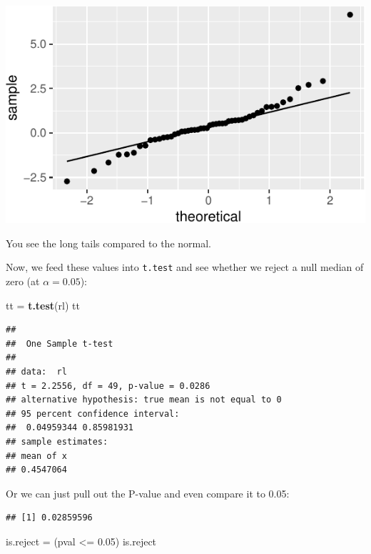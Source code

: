 \documentclass[]{tufte-book}
\newenvironment{Shaded}{}{}
\newcommand{\FloatTok}[1]{\textcolor[rgb]{0.25,0.63,0.44}{#1}}
\newcommand{\KeywordTok}[1]{\textcolor[rgb]{0.00,0.44,0.13}{\textbf{#1}}}
\newcommand{\NormalTok}[1]{#1}
\newcommand{\OperatorTok}[1]{\textcolor[rgb]{0.40,0.40,0.40}{#1}}
\newcommand{\StringTok}[1]{\textcolor[rgb]{0.25,0.44,0.63}{#1}}
\theoremstyle{definition}
\theoremstyle{definition}
\theoremstyle{definition}
\theoremstyle{remark}
\begin{document}
\includegraphics{07-sign-mood-median_files/figure-latex/unnamed-chunk-48-1}

You see the long tails compared to the normal.

Now, we feed these values into \texttt{t.test} and see whether we reject
a null median of zero (at \(\alpha=0.05\)):

\begin{Shaded}
\begin{Highlighting}[]
\NormalTok{tt =}\StringTok{ }\KeywordTok{t.test}\NormalTok{(rl)}
\NormalTok{tt}
\end{Highlighting}
\end{Shaded}

\begin{verbatim}
## 
##  One Sample t-test
## 
## data:  rl
## t = 2.2556, df = 49, p-value = 0.0286
## alternative hypothesis: true mean is not equal to 0
## 95 percent confidence interval:
##  0.04959344 0.85981931
## sample estimates:
## mean of x 
## 0.4547064
\end{verbatim}

Or we can just pull out the P-value and even compare it to 0.05:

\begin{Shaded}
\end{Shaded}

\begin{verbatim}
## [1] 0.02859596
\end{verbatim}

\begin{Shaded}
\begin{Highlighting}[]
\NormalTok{is.reject =}\StringTok{ }\NormalTok{(pval }\OperatorTok{<=}\StringTok{ }\FloatTok{0.05}\NormalTok{)}
\NormalTok{is.reject}
\end{Highlighting}
\end{Shaded}
\end{document}
